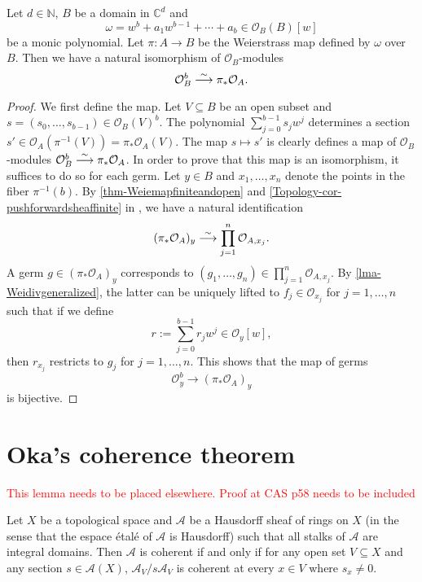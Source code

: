 \begin{thm}\label{thm-Weierstrassiso}
    Let $d\in \mathbb{N}$, $B$ be a domain in $\mathbb{C}^d$ and 
    \[
        \omega=w^b+ a_1 w^{b-1}+\cdots+a_b \in \mathcal{O}_B(B)[w]
    \] 
    be a monic polynomial. Let $\pi:A\rightarrow B$ be the Weierstrass map  defined by $\omega$ over $B$. Then we have a natural isomorphism of $\mathcal{O}_B$-modules
    \[
        \mathcal{O}_B^b\stackrel{\sim}{\longrightarrow} \pi_*\mathcal{O}_A.
    \]
\end{thm}
\begin{proof}
    We first define the map. Let $V\subseteq B$ be an open subset and $s=(s_0,\ldots,s_{b-1})\in \mathcal{O}_B(V)^b$. The polynomial $\sum_{j=0}^{b-1}s_j w^j$ determines a section $s'\in \mathcal{O}_A(\pi^{-1}(V))=\pi_*\mathcal{O}_A(V)$. The map $s\mapsto s'$ is clearly defines a map of $\mathcal{O}_B$-modules $\mathcal{O}_B^b\stackrel{\sim}{\longrightarrow} \pi_*\mathcal{O}_A$. In order to prove that this map is an isomorphism, it suffices to do so for each germ. Let $y\in B$ and $x_1,\ldots,x_n$ denote the points in the fiber $\pi^{-1}(b)$. By \cref{thm-Weiemapfiniteandopen} and \cref{Topology-cor-pushforwardsheaffinite} in , we have a natural identification
    \[
        (\pi_*\mathcal{O}_A)_y\stackrel{\sim}{\longrightarrow} \prod_{j=1}^n \mathcal{O}_{A,x_j}.
    \]
    A germ $g\in (\pi_*\mathcal{O}_A)_y$ corresponds to $(g_1,\ldots,g_n)\in \prod_{j=1}^n \mathcal{O}_{A,x_j}$. By \cref{lma-Weidivgeneralized}, the latter can be uniquely lifted to $f_j\in \mathcal{O}_{x_j}$ for $j=1,\ldots,n$ such that if we define
    \[
        r:=\sum_{j=0}^{b-1}r_j w^j\in \mathcal{O}_y[w],
    \]   
    then $r_{x_j}$ restricts to $g_j$ for $j=1,\ldots,n$. This shows that the map of germs
    \[
        \mathcal{O}_{y}^b \rightarrow (\pi_*\mathcal{O}_A)_y 
    \]
    is bijective.
\end{proof}

\section{Oka's coherence theorem}

\textcolor{red}{This lemma needs to be placed elsewhere. Proof at CAS p58 needs to be included}
\begin{lemma}\label{lma-formalcoherencecriterion}
    Let $X$ be a topological space and $\mathcal{A}$ be a Hausdorff sheaf of rings on $X$ (in the sense that the espace étalé of $\mathcal{A}$ is Hausdorff) such that all stalks of $\mathcal{A}$ are integral domains. Then $\mathcal{A}$ is coherent if and only if for any open set $V\subseteq X$ and any section $s\in \mathcal{A}(X)$, $\mathcal{A}_V/s\mathcal{A}_V$ is coherent at every $x\in V$ where $s_x\neq 0$.
\end{lemma}

